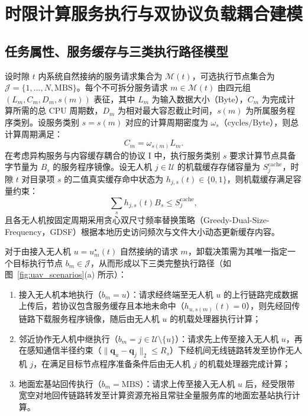 \section{时限计算服务执行与双协议负载耦合建模}
\label{sec:ch2-matching}
\label{sec:marl-technology}

\subsection{任务属性、服务缓存与三类执行路径模型}
\label{subsec:offloading}

设时隙 $t$ 内系统自然接纳的服务请求集合为 $\mathcal{M}(t)$，可选执行节点集合为 $\mathcal{J}=\{1,\ldots,N,\mathrm{MBS}\}$。每个不可拆分服务请求 $m\in\mathcal{M}(t)$ 由四元组 $(L_m,C_m,D_m,s(m))$ 表征，其中 $L_m$ 为输入数据大小（Byte），$C_m$ 为完成计算所需的总 CPU 周期数，$D_m$ 为相对最大容忍截止时间，$s(m)$ 为所属服务程序类别。设服务类别 $s=s(m)$ 对应的计算周期密度为 $\omega_s$（$\mathrm{cycles/Byte}$），则总计算周期满足：
\begin{equation}
    C_m=\omega_{s(m)} L_m.
    \label{eq:ch2-cycles}
\end{equation}
在考虑异构服务与内容缓存耦合的协议 I 中，执行服务类别 $s$ 要求计算节点具备字节量为 $B_s$ 的服务程序镜像。设无人机 $j\in\mathcal{U}$ 的机载缓存存储容量为 $S_j^{\mathrm{cache}}$，时隙 $t$ 对目录项 $s$ 的二值真实缓存命中状态为 $h_{j,s}(t)\in\{0,1\}$，则机载缓存满足容量约束：
\begin{equation}
    \sum_s h_{j,s}(t)B_s\leq S_j^{\mathrm{cache}},
    \label{eq:ch2-cache-capacity}
\end{equation}
且各无人机按固定周期采用贪心双尺寸频率替换策略（Greedy-Dual-Size-Frequency，GDSF）根据本地历史访问频次与文件大小动态更新缓存内容。

对于由接入无人机 $u=u_m^\star(t)$ 自然接纳的请求 $m$，卸载决策需为其唯一指定一个目标执行节点 $b_m\in\mathcal{J}$，从而形成以下三类完整执行路径（如图~\ref{fig:uav_scenarios}(a) 所示）：
\begin{enumerate}
\item 接入无人机本地执行（$b_m=u$）：请求经终端至无人机 $u$ 的上行链路完成数据上传后，若协议包含服务缓存且本地未命中（$h_{u,s(m)}(t)=0$），则先经回传链路下载服务程序镜像，随后由无人机 $u$ 的机载处理器执行计算；
\item 邻近协作无人机中继执行（$b_m=j\in\mathcal{U}\setminus\{u\}$）：请求先上传至接入无人机 $u$，再在感知通信半径约束（$\|\mathbf{q}_u-\mathbf{q}_j\|_2\le R_s$）下经机间无线链路转发至协作无人机 $j$，在满足目标节点程序准备条件后由无人机 $j$ 的机载处理器完成计算；
\item 地面宏基站回传执行（$b_m=\mathrm{MBS}$）：请求上传至接入无人机 $u$ 后，经受限带宽空对地回传链路转发至计算资源充裕且常驻全量服务库的地面宏基站执行计算。
\end{enumerate}

